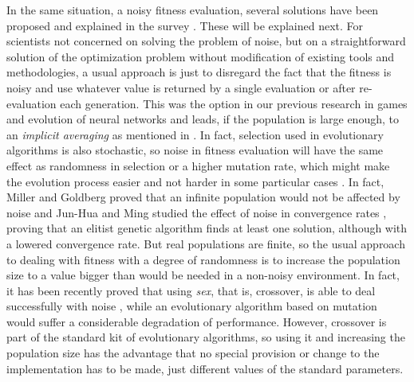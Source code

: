 \documentclass{svmult}
\begin{document}
\sloppypar In the same situation, a noisy fitness evaluation, several solutions have been
proposed and explained in the survey \cite{Jin2005303}. These will be
explained next.
For scientists not concerned on solving the problem of noise, but on
a straightforward solution of the optimization problem without
modification of existing tools and methodologies, a usual approach is
just to disregard the fact that the fitness is 
noisy and use whatever value is returned by a single evaluation or after
re-evaluation each generation. 
This was the option in our
previous research in games \cite{bots:evostar,DBLP:journals/jcst/MoraFGGF12,Liberatore_COSECIVI14} and evolution of neural networks \cite{castilloGECCO99,merelo:ESNN} and leads, if
the population is large enough, to an {\em implicit averaging} as
mentioned in \cite{Jin2005303}. In fact, selection used in evolutionary algorithms
is also stochastic, so noise in fitness evaluation
will have the same effect as randomness in selection or a higher mutation
rate, which might make the evolution process easier and not harder
in some particular cases
\cite{DBLP:journals/corr/QianYZ13}. 
In fact, Miller and Goldberg proved that an infinite population would not
be affected by noise \cite{miller1996genetic} and Jun-Hua and Ming studied the
effect of noise in convergence rates \cite{Junhua20136780}, proving
that an elitist genetic algorithm finds at least one solution, although with a lowered
convergence rate. But real populations are finite, so the usual
approach to dealing with fitness with a degree of randomness is to
increase the population size to a value bigger than 
would be needed in a non-noisy environment. In fact, it has been
recently proved that using {\em sex}, that is, crossover, is able to
deal successfully with noise \cite{2015arXiv150202793F}, while an
evolutionary algorithm based on mutation
would suffer a considerable degradation of performance. 
However, crossover is part of the standard kit of evolutionary
algorithms, so using it and increasing the population size has the
advantage that no special provision or change to the implementation
has to be made, just different values of the standard parameters.
\end{document}

